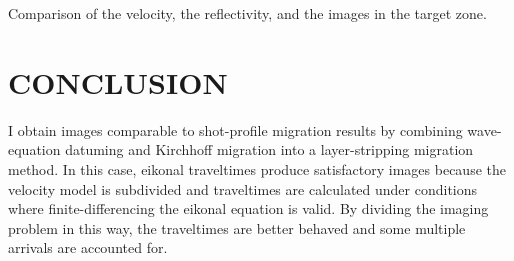 
{Comparison of the velocity, the reflectivity, and the images in the
target zone.}

\section{CONCLUSION}
I obtain images comparable to shot-profile migration results by 
combining wave-equation datuming and Kirchhoff migration into
a layer-stripping migration method. In this case, eikonal traveltimes produce
satisfactory images because the velocity model is subdivided 
and traveltimes are calculated 
under conditions where finite-differencing the eikonal equation is valid.
By dividing the imaging problem in this
way, the traveltimes are better behaved and some multiple arrivals
are accounted for.




